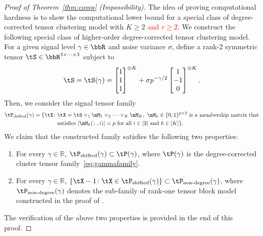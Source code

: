 \documentclass[lettersize,onecolumn,journal]{IEEEtran}
\theoremstyle{definition}
\theoremstyle{definition}
\begin{document}
\begin{proof}[Proof of Theorem~\ref{thm:comp} (Impossibility)]
The idea of proving computational hardness is to show the computational lower bound for a special class of degree-corrected tensor clustering model with $K\geq 2$ \textcolor{red}{and $ r \geq 2$}. We construct the following special class of higher-order degree-corrected tensor clustering  model. For a given signal level $\gamma\in\bbR$ and noise variance $\sigma$, define a rank-2 symmetric tensor $\tS\in\bbR^{3\times \cdots\times 3}$ subject to
\begin{equation}\label{eq:S}
\tS=\tS(\gamma) = \begin{bmatrix}
		1\\
		1\\
		1
		\end{bmatrix}^{\otimes K}
+\sigma p^{-\gamma/2} \begin{bmatrix}
		1\\
		-1\\
		0
	\end{bmatrix}^{\otimes K}.
\end{equation}
Then, we consider the signal tensor family
\begin{align}
\tP_{\text{shifted}}(\gamma)=\{\tX\colon & \tX=\tS\times_1\mM_1\times_2 \cdots \times_K\mM_K,\  \text{$\mM_k\in\{0,1\}^{p\times 3}$ is a membership matrix that}
\\
& \text{satisfies $|\mM_k(\colon,i)|\asymp p$ for all $i\in[3]$ and $k\in[K]$}\}.
\end{align}
We claim that the constructed family satisfies the following two properties:
\begin{enumerate}[wide,label=(\roman*)]
    \item For every $\gamma\in \mathbb{R}$, $\tP_{\text{shifted}}(\gamma)\subset \tP(\gamma)$, where $\tP(\gamma)$ is the degree-corrected cluster tensor family~\eqref{eq:gammafamily}.
    \item For every $\gamma\in \mathbb{R}$, $\{\tX-1\colon \tX\in \tP_{\text{shifted}}(\gamma)\}\subset \tP_{\text{non-degree}}(\gamma)$, where $\tP_{\text{non-degree}}(\gamma)$ denotes the sub-family of rank-one tensor block model constructed in the proof of \citet[Theorem 7]{han2020exact}. 
\end{enumerate}
The verification of the above two properties is provided in the end of this proof. 


\end{proof}
\end{document}
